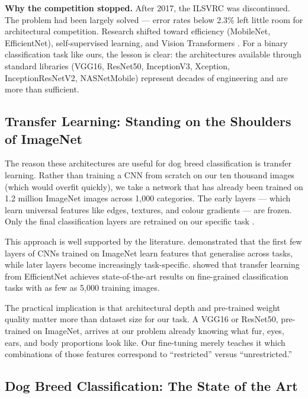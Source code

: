 \textbf{Why the competition stopped.} After 2017, the ILSVRC was discontinued. The problem had been largely solved --- error rates below 2.3\% left little room for architectural competition. Research shifted toward efficiency (MobileNet, EfficientNet), self-supervised learning, and Vision Transformers \citep{dosovitskiy2020image}. For a binary classification task like ours, the lesson is clear: the architectures available through standard libraries (VGG16, ResNet50, InceptionV3, Xception, InceptionResNetV2, NASNetMobile) represent decades of engineering and are more than sufficient.

\subsection{Transfer Learning: Standing on the Shoulders of ImageNet}

The reason these architectures are useful for dog breed classification is transfer learning. Rather than training a CNN from scratch on our ten thousand images (which would overfit quickly), we take a network that has already been trained on 1.2 million ImageNet images across 1,000 categories. The early layers --- which learn universal features like edges, textures, and colour gradients --- are frozen. Only the final classification layers are retrained on our specific task \citep{yosinski2014transferable}.

This approach is well supported by the literature. \citet{yosinski2014transferable} demonstrated that the first few layers of CNNs trained on ImageNet learn features that generalise across tasks, while later layers become increasingly task-specific. \citet{tan2019efficientnet} showed that transfer learning from EfficientNet achieves state-of-the-art results on fine-grained classification tasks with as few as 5,000 training images.

The practical implication is that architectural depth and pre-trained weight quality matter more than dataset size for our task. A VGG16 or ResNet50, pre-trained on ImageNet, arrives at our problem already knowing what fur, eyes, ears, and body proportions look like. Our fine-tuning merely teaches it which combinations of those features correspond to ``restricted'' versus ``unrestricted.''

\subsection{Dog Breed Classification: The State of the Art}

